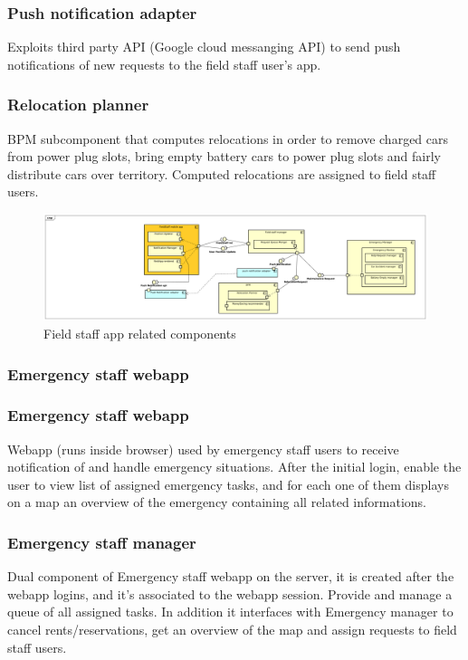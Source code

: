 \documentclass[english]{article}
\begin{document}
	\subsubsection{Push notification adapter}
	Exploits third party API (Google cloud messanging API) to send push notifications of new requests to the field staff user's app.
	\subsubsection{Relocation planner }
	BPM subcomponent that computes relocations in order to remove charged cars from power plug slots, bring empty battery cars to power plug slots and fairly distribute cars over territory. Computed relocations are assigned to field staff users.
	\begin{figure}[H]
		\centering
		\includegraphics[scale=0.21]{./ComponentDiagrams/FieldStaff.pdf}%
		\caption{Field staff app related components}
	\end{figure}
	
	
\subsubsection*{Emergency staff webapp}

	\subsubsection{Emergency staff webapp}
	Webapp (runs inside browser) used by emergency staff users to receive notification of and handle emergency situations. After the initial login, enable the user to view list of assigned emergency tasks, and for each one of them displays on a map an overview of the emergency containing all related informations.
	\subsubsection{Emergency staff manager}
	Dual component of Emergency staff webapp on the server, it is created after the webapp logins, and it's associated to the webapp session. Provide and manage a queue of all assigned tasks. In addition it interfaces with Emergency manager to cancel rents/reservations, get an overview of the map and assign requests to field staff users.
\end{document}
